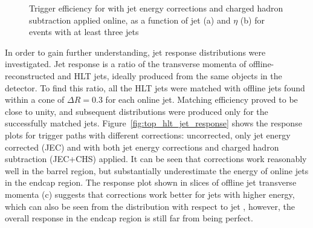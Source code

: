 \begin{figure}[hbtp]
  \centering
  \hfill
  \caption[Trigger efficiency for \HLTThreeCentralPFJet as a function of jet \pt and $\eta$]{Trigger efficiency for
  \HLTThreeCentralPFJet with jet energy corrections and charged hadron subtraction applied online, as a function of jet
  \pt (a) and $\eta$ (b) for events with at least three jets}
\label{fig:top_hlt_pt_eta_JEC_PFnoPU_3jets} 
\end{figure}

In order to gain further understanding, jet response distributions were investigated. Jet response is a ratio of the
transverse momenta of offline-reconstructed and HLT jets, ideally produced from the same objects in the detector. To
find this ratio, all the HLT jets were matched with offline jets found within a cone of $\Delta R = 0.3$ for each online
jet. Matching efficiency proved to be close to unity, and subsequent distributions were produced only for the
successfully matched jets. Figure~\ref{fig:top_hlt_jet_response} shows the response plots for trigger paths with
different corrections: uncorrected, only jet energy corrected (JEC) and with both jet energy corrections and charged
hadron subtraction (JEC+CHS) applied. It can be seen that corrections work reasonably well in the barrel region, but
substantially underestimate the energy of online jets in the endcap region. The response plot shown in slices of offline
jet transverse momenta (c) suggests that corrections work better for jets with higher energy, which can also be seen
from the distribution with respect to jet \pt, however, the overall response in the endcap region is still far from
being perfect.

